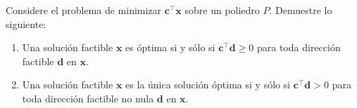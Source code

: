 Considere el problema de minimizar $\mathbf{c}^\top \mathbf{x}$ sobre un poliedro $P$. Demuestre lo siguiente:

\begin{enumerate}
\item[(a)] Una solución factible $\mathbf{x}$ es óptima si y sólo si $\mathbf{c^\top d} \ge 0$ para toda dirección factible $\mathbf{d}$ en $\mathbf{x}$.

\item[(b)] Una solución factible $\mathbf{x}$ es la única solución óptima si y sólo si $\mathbf{c^\top d} > 0$ para toda dirección factible no nula $\mathbf{d}$ en $\mathbf{x}$.
\end{enumerate}

